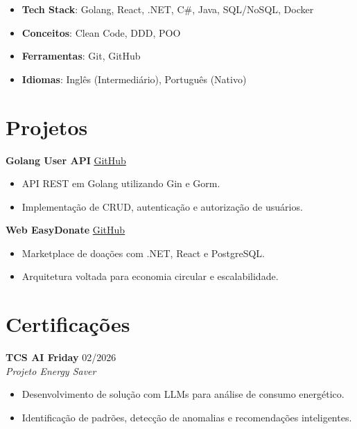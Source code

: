 \documentclass[a4paper,10pt]{article}
\newcommand{\entry}[4]{
  \noindent\textbf{#1} \hfill #2 \\
  \noindent\textit{#3} \hfill \textit{#4} \\
  \vspace{2pt}
}
\newcommand{\project}[2]{
  \noindent\textbf{#1} \hfill #2 \\
  \vspace{2pt}
}
\begin{document}
\begin{itemize}[leftmargin=*, itemsep=2pt]
\setlength\itemsep{0em}
\item \textbf{Tech Stack}: Golang, React, .NET, C\#, Java, SQL/NoSQL, Docker
\item \textbf{Conceitos}: Clean Code, DDD, POO
\item \textbf{Ferramentas}: Git, GitHub
\item \textbf{Idiomas}: Inglês (Intermediário), Português (Nativo)
\end{itemize}

\section*{Projetos}

\project{Golang User API}{\href{https://github.com/H0wZy/user-api}{\faLink \space GitHub}}
\vspace{-0.4em}
\begin{itemize}[leftmargin=*, itemsep=2pt]
\setlength\itemsep{0em}
\item API REST em Golang utilizando Gin e Gorm.
\item Implementação de CRUD, autenticação e autorização de usuários.
\end{itemize}

\project{Web EasyDonate}{\href{https://github.com/H0wZy/web.easydonate}{\faLink \space GitHub}}
\vspace{-0.4em}
\begin{itemize}[leftmargin=*, itemsep=2pt]
\setlength\itemsep{0em}
\item Marketplace de doações com .NET, React e PostgreSQL.
\item Arquitetura voltada para economia circular e escalabilidade.
\end{itemize}

\section*{Certificações}

\entry{TCS AI Friday}{02/2026}{Projeto Energy Saver}{}
\vspace{-0.4em}
\begin{itemize}[leftmargin=*, itemsep=2pt]
\setlength\itemsep{0em}
\item Desenvolvimento de solução com LLMs para análise de consumo energético.
\item Identificação de padrões, detecção de anomalias e recomendações inteligentes.
\end{itemize}
\end{document}
